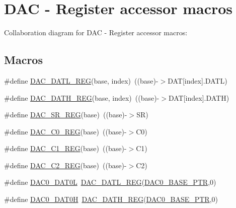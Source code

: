 \hypertarget{group___d_a_c___register___accessor___macros}{}\section{D\+AC -\/ Register accessor macros}
\label{group___d_a_c___register___accessor___macros}
Collaboration diagram for D\+AC -\/ Register accessor macros\+:
\subsection*{Macros}
\begin{DoxyCompactItemize}
\item 
\#define \hyperlink{group___d_a_c___register___accessor___macros_ga08d6968ef33456980d21911ea2ed00f5}{D\+A\+C\+\_\+\+D\+A\+T\+L\+\_\+\+R\+EG}(base,  index)~((base)-\/$>$D\+AT\mbox{[}index\mbox{]}.D\+A\+TL)
\item 
\#define \hyperlink{group___d_a_c___register___accessor___macros_ga53b85847dea8002316aa2880d5c27f68}{D\+A\+C\+\_\+\+D\+A\+T\+H\+\_\+\+R\+EG}(base,  index)~((base)-\/$>$D\+AT\mbox{[}index\mbox{]}.D\+A\+TH)
\item 
\#define \hyperlink{group___d_a_c___register___accessor___macros_ga689d7e5290e37e3690b476afe279548c}{D\+A\+C\+\_\+\+S\+R\+\_\+\+R\+EG}(base)~((base)-\/$>$SR)
\item 
\#define \hyperlink{group___d_a_c___register___accessor___macros_ga535f8efe3924aa0e193dc9a57b4cae83}{D\+A\+C\+\_\+\+C0\+\_\+\+R\+EG}(base)~((base)-\/$>$C0)
\item 
\#define \hyperlink{group___d_a_c___register___accessor___macros_ga5177a56f528748e9c9e8138a130a289d}{D\+A\+C\+\_\+\+C1\+\_\+\+R\+EG}(base)~((base)-\/$>$C1)
\item 
\#define \hyperlink{group___d_a_c___register___accessor___macros_ga0960302c90bdaf9930ed8dd663893ec4}{D\+A\+C\+\_\+\+C2\+\_\+\+R\+EG}(base)~((base)-\/$>$C2)
\item 
\#define \hyperlink{group___d_a_c___register___accessor___macros_ga42102f01d7c10ffe6e888e69befd52cd}{D\+A\+C0\+\_\+\+D\+A\+T0L}~\hyperlink{group___d_a_c___register___accessor___macros_ga08d6968ef33456980d21911ea2ed00f5}{D\+A\+C\+\_\+\+D\+A\+T\+L\+\_\+\+R\+EG}(\hyperlink{group___d_a_c___peripheral_gabe3b30df06ec04e5c899efd6e49f1800}{D\+A\+C0\+\_\+\+B\+A\+S\+E\+\_\+\+P\+TR},0)
\item 
\#define \hyperlink{group___d_a_c___register___accessor___macros_ga3ad29b1caa28a60ed8fbb86aa56b76e6}{D\+A\+C0\+\_\+\+D\+A\+T0H}~\hyperlink{group___d_a_c___register___accessor___macros_ga53b85847dea8002316aa2880d5c27f68}{D\+A\+C\+\_\+\+D\+A\+T\+H\+\_\+\+R\+EG}(\hyperlink{group___d_a_c___peripheral_gabe3b30df06ec04e5c899efd6e49f1800}{D\+A\+C0\+\_\+\+B\+A\+S\+E\+\_\+\+P\+TR},0)

\end{DoxyCompactItemize}
